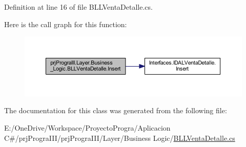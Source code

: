 Definition at line 16 of file B\+L\+L\+Venta\+Detalle.\+cs.

Here is the call graph for this function\+:
\nopagebreak
\begin{figure}[H]
\begin{center}
\leavevmode
\includegraphics[width=350pt]{classprj_progra_i_i_i_1_1_layer_1_1_business___logic_1_1_b_l_l_venta_detalle_a5d13037ef7919552e90d8f6a50862db4_cgraph}
\end{center}
\end{figure}


The documentation for this class was generated from the following file\+:\begin{DoxyCompactItemize}
\item 
E\+:/\+One\+Drive/\+Workspace/\+Proyecto\+Progra/\+Aplicacion C\#/prj\+Progra\+I\+I\+I/prj\+Progra\+I\+I\+I/\+Layer/\+Business Logic/\hyperlink{_b_l_l_venta_detalle_8cs}{B\+L\+L\+Venta\+Detalle.\+cs}\end{DoxyCompactItemize}
